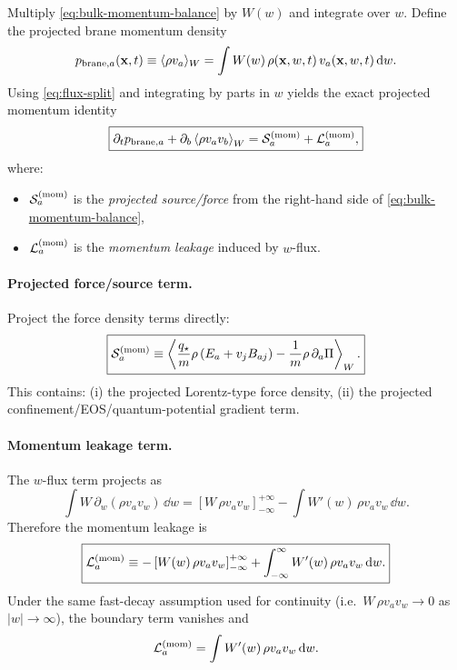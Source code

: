 \documentclass[11pt]{article}
\newcommand{\qstar}{q_\star}
\begin{document}
Multiply \eqref{eq:bulk-momentum-balance} by $W(w)$ and integrate over $w$. Define the projected brane momentum density
\begin{equation}
p_{{\rm brane},a}(\mathbf{x},t)\equiv \langle \rho v_a\rangle_W = \int W(w)\,\rho(\mathbf{x},w,t)\,v_a(\mathbf{x},w,t)\,\dd w.
\label{eq:pbrane-def}
\end{equation}
Using \eqref{eq:flux-split} and integrating by parts in $w$ yields the exact projected momentum identity
\begin{equation}
\boxed{
\partial_t p_{{\rm brane},a}
+
\partial_b \left\langle \rho v_a v_b \right\rangle_W
=
\mathcal{S}^{({\rm mom})}_a
+
\mathcal{L}^{({\rm mom})}_a,
}
\label{eq:proj-momentum-raw}
\end{equation}
where:
\begin{itemize}[leftmargin=2.0em]
\item $\mathcal{S}^{({\rm mom})}_a$ is the \emph{projected source/force} from the right-hand side of \eqref{eq:bulk-momentum-balance},
\item $\mathcal{L}^{({\rm mom})}_a$ is the \emph{momentum leakage} induced by $w$-flux.
\end{itemize}

\paragraph{Projected force/source term.}
Project the force density terms directly:
\begin{equation}
\boxed{
\mathcal{S}^{({\rm mom})}_a
\equiv
\left\langle
\frac{\qstar}{m}\rho\,(E_a+v_j B_{aj})
-\frac{1}{m}\rho\,\partial_a\Pi
\right\rangle_W.
}
\label{eq:proj-mom-source}
\end{equation}
This contains: (i) the projected Lorentz-type force density, (ii) the projected confinement/EOS/quantum-potential gradient term.

\paragraph{Momentum leakage term.}
The $w$-flux term projects as
\begin{equation}
\int W\,\partial_w(\rho v_a v_w)\,\dd w
=
\left[ W\,\rho v_a v_w \right]_{-\infty}^{+\infty}
-
\int W'(w)\,\rho v_a v_w\,\dd w.
\end{equation}
Therefore the momentum leakage is
\begin{equation}
\boxed{
\mathcal{L}^{({\rm mom})}_a
\equiv
-\left[ W(w)\,\rho v_a v_w \right]_{-\infty}^{+\infty}
+
\int_{-\infty}^{\infty} W'(w)\,\rho v_a v_w\,\dd w.
}
\label{eq:proj-mom-leak}
\end{equation}
Under the same fast-decay assumption used for continuity (i.e.\ $W\,\rho v_a v_w\to 0$ as $|w|\to\infty$), the boundary term vanishes and
\begin{equation}
\mathcal{L}^{({\rm mom})}_a
=
\int W'(w)\,\rho v_a v_w\,\dd w.
\end{equation}
\end{document}
